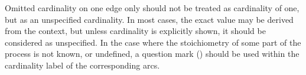 Omitted cardinality on one edge only should not be treated as cardinality of one, but as an unspecified cardinality.
In most cases, the exact value may be derived from the context, but unless cardinality is explicitly shown, it should be considered as unspecified.
In the case where the stoichiometry of some part of the process is not known, or undefined, a question mark () should be used within the cardinality label of the corresponding arcs.

